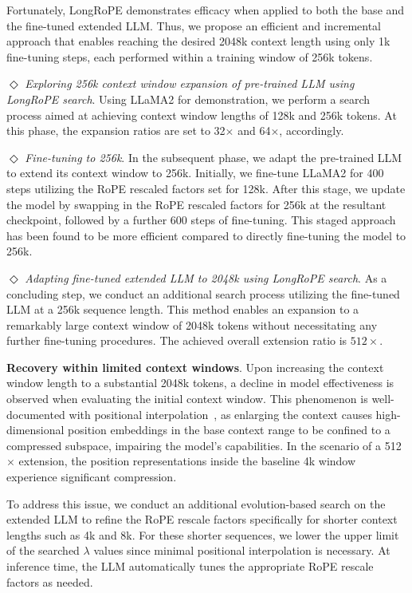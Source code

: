 Fortunately, LongRoPE demonstrates efficacy when applied to both the base and the fine-tuned extended LLM. Thus, we propose an efficient and incremental approach that enables reaching the desired 2048k context length using only 1k fine-tuning steps, each performed within a training window of 256k tokens.

$\Diamond$ \textit{Exploring 256k context window expansion of pre-trained LLM using LongRoPE search}. Using LLaMA2 for demonstration, we perform a search process aimed at achieving context window lengths of 128k and 256k tokens. At this phase, the expansion ratios are set to 32$\times$ and 64$\times$, accordingly.

$\Diamond$ \textit{Fine-tuning to 256k}. In the subsequent phase, we adapt the pre-trained LLM to extend its context window to 256k. Initially, we fine-tune LLaMA2 for 400 steps utilizing the RoPE rescaled factors set for 128k. After this stage, we update the model by swapping in the RoPE rescaled factors for 256k at the resultant checkpoint, followed by a further 600 steps of fine-tuning. This staged approach has been found to be more efficient compared to directly fine-tuning the model to 256k.

$\Diamond$ \textit{Adapting fine-tuned extended LLM to 2048k using LongRoPE search}. As a concluding step, we conduct an additional search process utilizing the fine-tuned LLM at a 256k sequence length. This method enables an expansion to a remarkably large context window of 2048k tokens without necessitating any further fine-tuning procedures. The achieved overall extension ratio is $512\times$.

\textbf{Recovery within limited context windows}. Upon increasing the context window length to a substantial 2048k tokens, a decline in model effectiveness is observed when evaluating the initial context window. This phenomenon is well-documented with positional interpolation~\cite{pi}, as enlarging the context causes high-dimensional position embeddings in the base context range to be confined to a compressed subspace, impairing the model’s capabilities. In the scenario of a 512$\times$ extension, the position representations inside the baseline 4k window experience significant compression.

To address this issue, we conduct an additional evolution-based search on the extended LLM to refine the RoPE rescale factors specifically for shorter context lengths such as 4k and 8k. For these shorter sequences, we lower the upper limit of the searched $\lambda$ values since minimal positional interpolation is necessary. At inference time, the LLM automatically tunes the appropriate RoPE rescale factors as needed.

